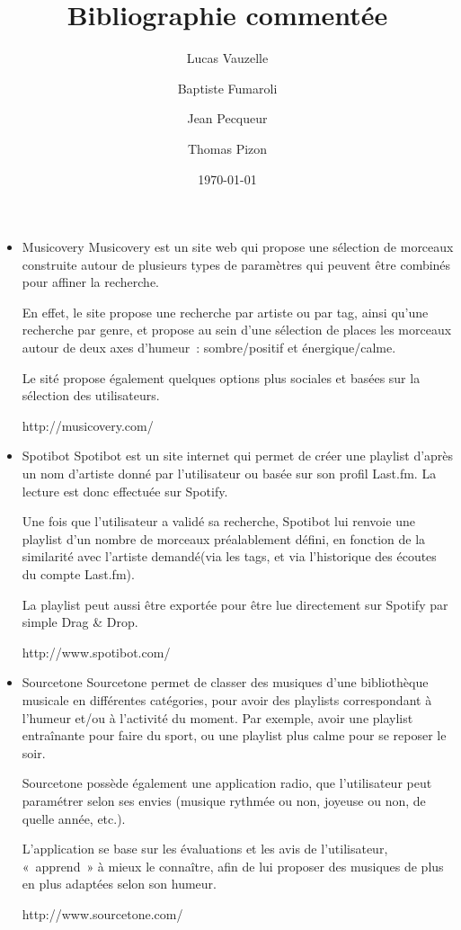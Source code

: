 \documentclass{article}
\title{Bibliographie commentée}
\author{Lucas Vauzelle \and Baptiste Fumaroli \and Jean Pecqueur \and Thomas Pizon}
\date{\today}
\begin{document}
\maketitle

\begin{itemize}

\item Musicovery
Musicovery est un site web qui propose une sélection de morceaux construite
autour de plusieurs types de paramètres qui peuvent être combinés pour affiner
la recherche.

En effet, le site propose une recherche par artiste ou par tag, ainsi qu'une
recherche par genre, et propose au sein d'une sélection de places les morceaux
autour de deux axes d'humeur~: sombre/positif et énergique/calme.

Le sité propose également quelques options plus sociales et basées sur la
sélection des utilisateurs.

http://musicovery.com/

\item Spotibot
Spotibot est un site internet qui permet de créer une playlist d'après un nom
d'artiste donné par l'utilisateur ou basée sur son profil Last.fm. La lecture
est donc effectuée sur Spotify.

Une fois que l'utilisateur a validé sa recherche, Spotibot lui renvoie une
playlist d'un nombre de morceaux préalablement défini, en fonction de la
similarité avec l'artiste demandé(via les tags, et via l'historique des écoutes
du compte Last.fm).

La playlist peut aussi être exportée pour être lue directement sur Spotify par
simple Drag & Drop.

http://www.spotibot.com/

\item Sourcetone
Sourcetone permet de classer des musiques d'une bibliothèque musicale en
différentes catégories, pour avoir des playlists correspondant à l'humeur et/ou
à l'activité du moment. Par exemple, avoir une playlist entraînante pour faire
du sport, ou une playlist plus calme pour se reposer le soir.

Sourcetone possède également une application radio, que l'utilisateur peut
paramétrer selon ses envies (musique rythmée ou non, joyeuse ou non, de quelle
année, etc.).

L'application se base sur les évaluations et les avis de l'utilisateur,
«~apprend~» à mieux le connaître, afin de lui proposer des musiques de plus en
plus adaptées selon son humeur.

http://www.sourcetone.com/

\end{itemize}
\end{document}
